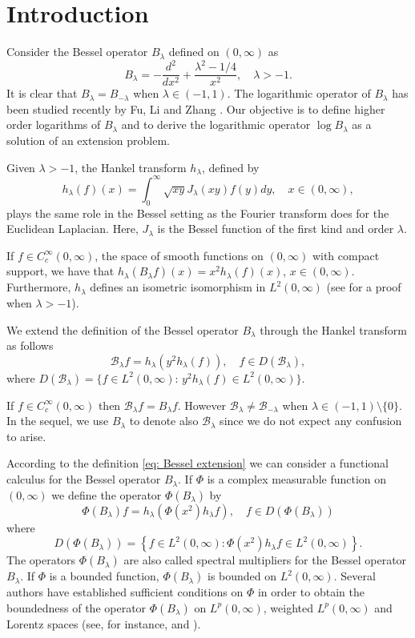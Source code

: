 \documentclass[a4paper,10pt, reqno]{amsart}
\theoremstyle{definition}
\theoremstyle{remark}
\numberwithin{equation}{section}
\begin{document}
\section{Introduction}
Consider the Bessel operator $B_\lambda$ defined on $(0,\infty)$ as
\[
B_\lambda =-\frac{d^2}{dx^2}+\frac{\lambda^2-1/4}{x^2},\quad \lambda >-1.
\]
It is clear that $B_\lambda=B_{-\lambda}$ when $\lambda\in (-1,1)$. The logarithmic operator of $B_\lambda$  has been studied recently by Fu, Li and Zhang \cite{FLZ}. Our objective is to define higher order logarithms of $B_\lambda$ and to derive the logarithmic operator $\log B_\lambda$ as a solution of an extension problem.

Given $\lambda >-1$, the Hankel transform $h_\lambda$, defined by
\[
h_\lambda (f)(x)=\int_0^\infty \sqrt{xy}J_\lambda (xy)f(y)dy,\quad x\in (0,\infty),
\]
plays the same role in the Bessel setting as the Fourier transform does for the Euclidean Laplacian. Here, $J_\lambda$ is the Bessel function of the first kind and order $\lambda$. 

If $f\in C_c^\infty (0,\infty)$, the space of smooth functions on $(0,\infty)$ with compact support, we have that $h_\lambda (B_\lambda f)(x)=x^2h_\lambda (f)(x)$, $x\in (0,\infty)$. Furthermore, $h_\lambda $ defines an isometric isomorphism in $L^2(0,\infty)$ (see \cite[Lemma 2.7]{BS} for a proof when $\lambda >-1$). 

We extend the definition of the Bessel operator $B_\lambda$ through the Hankel transform as follows
\begin{equation}\label{eq: Bessel extension}
{\mathcal B}_\lambda f=h_\lambda (y^2h_\lambda (f)),\quad f\in D(\mathcal B_\lambda),
\end{equation}
where $D(\mathcal B_\lambda)=\{f\in L^2(0,\infty): \,y^2h_\lambda (f)\in L^2(0,\infty)\}$. 


If $f\in C_c^\infty (0,\infty)$ then $\mathcal B_\lambda f=B_\lambda f$. However $\mathcal B_\lambda\neq\mathcal{B}_{-\lambda}$ when $\lambda\in (-1,1)\setminus\{0\}$. In the sequel, we use $B_\lambda$ to denote also $\mathcal B_\lambda$ since we do not expect any confusion to arise. 

According to the definition \eqref{eq: Bessel extension} we can consider a functional calculus for the Bessel operator $B_\lambda$. If $\Phi$ is a complex measurable function on $(0,\infty)$ we define the operator $\Phi(B_\lambda)$ by
\begin{equation}\label{eq: spectral multiplier}
\Phi (B_\lambda)f=h_\lambda (\Phi (x^2)h_\lambda f),\quad f\in D(\Phi (B_\lambda))
\end{equation}
where 
\[
D(\Phi (B_\lambda))=\left\{f\in L^2(0,\infty): \Phi (x^2)h_\lambda f\in L^2(0,\infty)\right\}.
\]
The operators $\Phi (B_\lambda)$ are also called spectral multipliers for the Bessel operator $B_\lambda$. If $\Phi$ is a bounded function, $\Phi (B_\lambda)$ is bounded on $L^2(0,\infty)$. Several authors have established sufficient conditions on  $\Phi$ in order to obtain the boundedness of the operator $\Phi (B_\lambda)$ on $L^p(0,\infty)$, weighted $L^p(0,\infty)$ and Lorentz spaces (see, for instance, \cite{BMR, CS, GaS, GT, Gs, Gu, HNS, Ka} and \cite{ST}).
\end{document}
